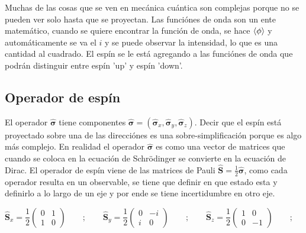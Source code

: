 \documentclass[11pt,fleqn]{book}
\renewcommand{\vec}[1]{\mathbf{#1}}
\begin{document}
\begin{remark}
Muchas de las cosas que se ven en mecánica cuántica son complejas porque no se pueden ver solo hasta que se proyectan. Las funciónes de onda son un ente matemático, cuando se quiere encontrar la función de onda, se hace $\braket{\phi}$ y automáticamente se va el $i$ y se puede observar la intensidad, lo que es una cantidad al cuadrado. El espín se le está agregando a las funciónes de onda que podrán distinguir entre espín 'up' y espín 'down'.
\end{remark}

\subsection{Operador de espín}

El operador $\hat{\vec{\sigma}}$ tiene componentes $\hat{\vec{\sigma}}=(\hat{\vec{\sigma}}_{x},\hat{\vec{\sigma}}_{y},\hat{\vec{\sigma}}_{z})$. Decir que el espín está proyectado sobre una de las direcciónes es una sobre-simplificación porque es algo más complejo. En realidad el operador $\hat{\vec{\sigma}}$ es como una vector de matrices que cuando se coloca en la ecuación de Schrödinger se convierte en la ecuación de Dirac. El operador de espín viene de las matrices de Pauli $\hat{\vec{S}}=\frac{1}{2}\hat{\vec{\sigma}}$, como cada operador resulta en un observable, se tiene que definir en que estado esta y definirlo a lo largo de un eje y por ende se tiene incertidumbre en otro eje.

\begin{equation}
    \hat{\vec{S}}_{x}=\frac{1}{2}\begin{pmatrix}
                                    0 & 1 \\
                                    1 & 0 
                               \end{pmatrix}\qquad;\qquad\hat{\vec{S}}_{y}=\frac{1}{2}\begin{pmatrix}
                                    0 & -i \\
                                    i & 0 
                               \end{pmatrix}\qquad;\qquad\hat{\vec{S}}_{z}=\frac{1}{2}\begin{pmatrix}
                                    1 & 0 \\
                                    0 & -1 
                               \end{pmatrix}\qquad;\qquad
    \label{Eq. 2.26}                            
\end{equation}
\end{document}
